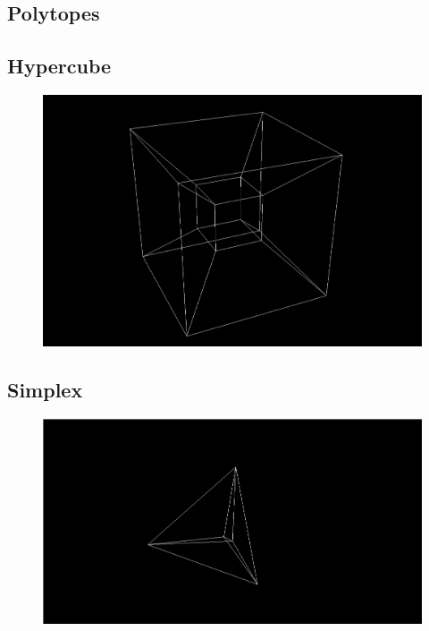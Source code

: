 \documentclass[11pt, a4paper]{article}
\begin{document}
\cleardoublepage
\begin{appendices}

\section{Polytopes}
\label{app:polytopes}

\subsection*{Hypercube}

\begin{figure}[!h]
  \centering
  \includegraphics[width=\textwidth]{img/hypercube.png}
\end{figure}



\pagebreak
\subsection*{Simplex}

\begin{figure}[!h]
  \centering
  \includegraphics[width=15cm]{img/simplex.png}
\end{figure}


\end{appendices}
\end{document}
